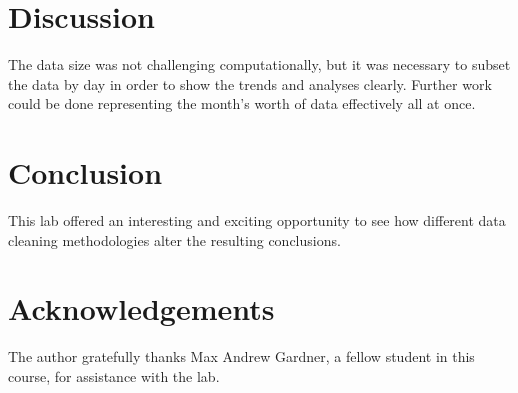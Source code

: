 \documentclass[english]{article}\usepackage[]{graphicx}\usepackage[]{color}
\begin{document}
\section{Discussion}

The data size was not challenging computationally, but it was necessary to subset the data by
day in order to show the trends and analyses clearly.  Further work could be done representing the 
month's worth of data effectively all at once.

\section{Conclusion}

This lab offered an interesting and exciting opportunity to see how different data cleaning 
methodologies alter the resulting conclusions.

\section{Acknowledgements}

The author gratefully thanks Max Andrew Gardner, a fellow student in this course, for assistance with the lab.
\end{document}
